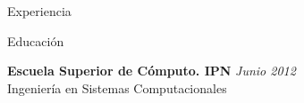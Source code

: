 \documentclass{resume} %
\begin{document}
\begin{rSection}{Experiencia}
\end{rSection}


%
%



\begin{rSection}{Educación}

{\bf Escuela Superior de Cómputo. IPN} \hfill {\em Junio 2012} \\
Ingeniería en Sistemas Computacionales \\

\end{rSection}





\end{document}
